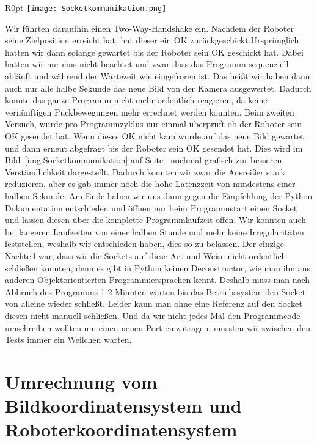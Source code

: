 \begin{wrapfigure}{R}{0pt}
	\vspace{-15pt}
	\texttt{[image: Socketkommunikation.png]}
	\vspace{-15pt}
	\caption{ Veranschaulichung der Socketkommunikation}
	\vspace{-15pt}
	\label{img:Socketkommunikation}
\end{wrapfigure}
Wir führten daraufhin einen Two-Way-Handshake ein. Nachdem der Roboter seine Zielposition erreicht hat, hat dieser ein OK zurückgeschickt.Ursprünglich hatten wir dann solange gewartet bis der Roboter sein OK geschickt hat. Dabei hatten wir nur eins nicht beachtet und zwar dass das Programm sequenziell abläuft und während der Wartezeit wie eingefroren ist. Das heißt wir haben dann auch nur alle halbe Sekunde das neue Bild von der Kamera ausgewertet. Dadurch konnte das ganze Programm nicht mehr ordentlich reagieren, da keine vernünftigen Puckbewegungen mehr errechnet werden konnten. Beim zweiten Versuch, wurde pro Programmzyklus nur einmal überprüft ob der Roboter sein OK gesendet hat. Wenn dieses OK nicht kam wurde auf das neue Bild gewartet und dann erneut abgefragt bis der Roboter sein OK gesendet hat. Dies wird im Bild~\ref{img:Socketkommunikation} auf Seite~\pageref{img:Socketkommunikation} nochmal grafisch zur besseren Verständlichkeit dargestellt. Dadurch konnten wir zwar die Ausreißer stark reduzieren, aber es gab immer noch die hohe Latenzzeit von mindestens einer halben Sekunde. Am Ende haben wir uns dann gegen die Empfehlung der Python Dokumentation entschieden und öffnen nur beim Programmstart einen Socket und lassen diesen über die komplette Programmlaufzeit offen. Wir konnten auch bei längeren Laufzeiten von einer halben Stunde und mehr keine Irregularitäten feststellen, weshalb wir entschieden haben, dies so zu belassen. Der einzige Nachteil war, dass wir die Sockets auf diese Art und Weise nicht ordentlich schließen konnten, denn es gibt in Python keinen Deconstructor, wie man ihn aus anderen Objektorientierten Programmiersprachen kennt. Deshalb muss man nach Abbruch des Programms 1-2 Minuten warten bis das Betriebssystem den Socket von alleine wieder schließt. Leider kann man ohne eine Referenz auf den Socket diesen nicht manuell schließen. Und da wir nicht jedes Mal den Programmcode umschreiben wollten um einen neuen Port einzutragen, mussten wir zwischen den Tests immer ein Weilchen warten.

\pagebreak
\section{Umrechnung vom Bildkoordinatensystem und Roboterkoordinatensystem}

